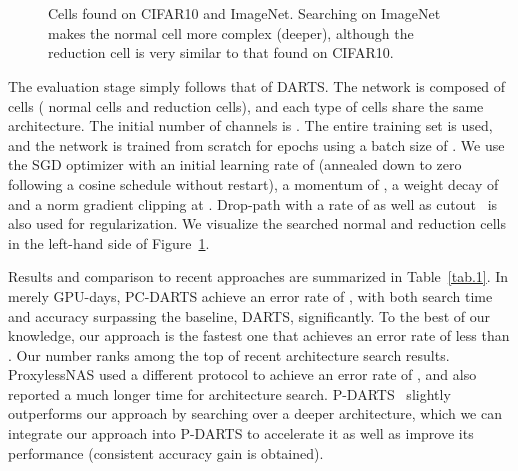 \documentclass{article} \usepackage{iclr2020_conference,times}
\begin{document}
\begin{figure}[t]
\centering
\begin{minipage}{0.49\textwidth}
\label{ncells_s1}\\
\label{ncells_s2}
\end{minipage}
\begin{minipage}{0.49\textwidth}
\label{ncells_s3}\\
\begin{center}
\label{ncells_dv2}
\end{center}
\end{minipage}
\caption{Cells found on CIFAR10 and ImageNet. Searching on ImageNet makes the normal cell more complex (deeper), although the reduction cell is very similar to that found on CIFAR10.}
\label{fig:cells}
\end{figure}

The evaluation stage simply follows that of DARTS. The network is composed of  cells ( normal cells and  reduction cells), and each type of cells share the same architecture. The initial number of channels is . The entire  training set is used, and the network is trained from scratch for  epochs using a batch size of . We use the SGD optimizer with an initial learning rate of  (annealed down to zero following a cosine schedule without restart), a momentum of , a weight decay of  and a norm gradient clipping at . Drop-path with a rate of  as well as cutout~\citep{devries2017improved} is also used for regularization. We visualize the searched normal and reduction cells in the left-hand side of Figure~\ref{fig:cells}.

Results and comparison to recent approaches are summarized in Table~\ref{tab.1}. In merely  GPU-days, PC-DARTS achieve an error rate of , with both search time and accuracy surpassing the baseline, DARTS, significantly. To the best of our knowledge, our approach is the fastest one that achieves an error rate of less than . Our number ranks among the top of recent architecture search results. ProxylessNAS used a different protocol to achieve an error rate of , and also reported a much longer time for architecture search. P-DARTS~\citep{chen2019progressive} slightly outperforms our approach by searching over a deeper architecture, which we can integrate our approach into P-DARTS to accelerate it as well as improve its performance (consistent accuracy gain is obtained).
\end{document}
